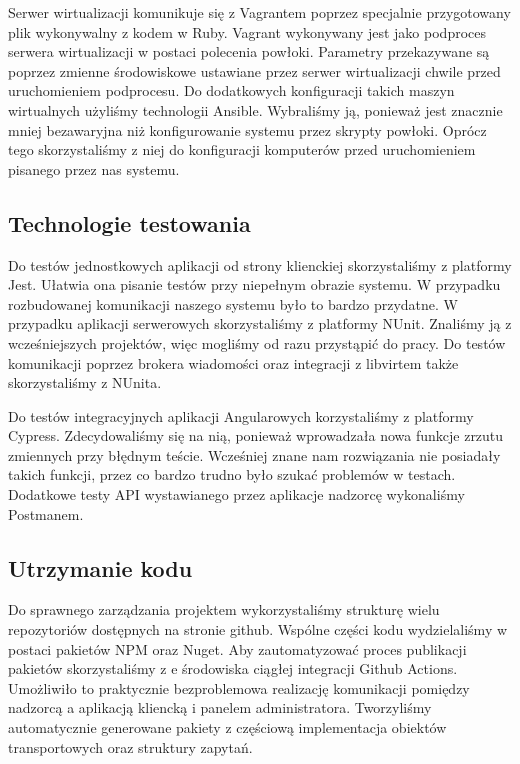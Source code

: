 \documentclass[../opis-rozwiazania.tex]{subfiles}
\begin{document}
Serwer wirtualizacji komunikuje się z Vagrantem poprzez specjalnie przygotowany plik wykonywalny z kodem w Ruby.
Vagrant wykonywany jest jako podproces serwera wirtualizacji w postaci polecenia powłoki.
Parametry przekazywane są poprzez zmienne środowiskowe ustawiane przez serwer wirtualizacji chwile przed uruchomieniem podprocesu.
Do dodatkowych konfiguracji takich maszyn wirtualnych użyliśmy technologii Ansible.
Wybraliśmy ją, ponieważ jest znacznie mniej bezawaryjna niż konfigurowanie systemu przez skrypty powłoki.
Oprócz tego skorzystaliśmy z niej do konfiguracji komputerów przed uruchomieniem pisanego przez nas systemu.

\subsection{Technologie testowania}
Do testów jednostkowych aplikacji od strony klienckiej skorzystaliśmy z platformy Jest.
Ułatwia ona pisanie testów przy niepełnym obrazie systemu. W przypadku rozbudowanej komunikacji naszego systemu było to bardzo przydatne.
W przypadku aplikacji serwerowych skorzystaliśmy z platformy NUnit.
Znaliśmy ją z wcześniejszych projektów, więc mogliśmy od razu przystąpić do pracy.
Do testów komunikacji poprzez brokera wiadomości oraz integracji z libvirtem także skorzystaliśmy z NUnita.

Do testów integracyjnych aplikacji Angularowych korzystaliśmy z platformy Cypress.
Zdecydowaliśmy się na nią, ponieważ wprowadzała nowa funkcje zrzutu zmiennych przy błędnym teście.
Wcześniej znane nam rozwiązania nie posiadały takich funkcji, przez co bardzo trudno było szukać problemów w testach.
Dodatkowe testy API wystawianego przez aplikacje nadzorcę wykonaliśmy Postmanem.

\subsection{Utrzymanie kodu}
Do sprawnego zarządzania projektem wykorzystaliśmy strukturę wielu repozytoriów dostępnych na stronie github.
Wspólne części kodu wydzielaliśmy w postaci pakietów NPM oraz Nuget.
Aby zautomatyzować proces publikacji pakietów skorzystaliśmy z e środowiska ciągłej integracji Github Actions.
Umożliwiło to praktycznie bezproblemowa realizację komunikacji pomiędzy nadzorcą a aplikacją kliencką i panelem administratora.
Tworzyliśmy automatycznie generowane pakiety z częściową implementacja obiektów transportowych oraz struktury zapytań.
\end{document}
